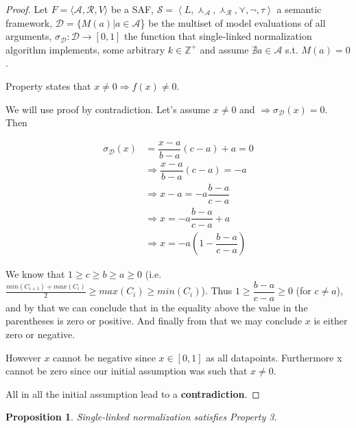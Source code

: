 \documentclass{article}
\newtheorem{proposition}{Proposition}
\newcommand{\real}{\mathbb{R}}  %
\newcommand{\args}{\mathcal{A}} %
\newcommand{\att}{\mathcal{R}}  %
\newcommand{\valueset}{L}
\newcommand{\safid}{F}               %
\newcommand{\saf}{\safid = \safbody} %
\newcommand{\safbody}{\langle \args, \att, V \rangle} %
\newcommand{\sembodyNew}{\left\langle \valueset,\SAFand_\mathcal{A}, \SAFand_\mathcal{R},\SAFor,\lnot,\tau \right\rangle} %
\newcommand{\SAFand}{\curlywedge}     %
\newcommand{\SAFor}{\curlyvee}        %
\newcommand{\sem}{\mathcal{S}}
\newcommand{\dataset}{\mathcal{D}}   %
\begin{document}
\begin{proof}
Let $\saf$ be a SAF, $\sem = \sembodyNew$ a semantic framework, $\dataset = \{M(a)|a \in \args$\} be the multiset of model evaluations of all arguments, $\sigma_{\dataset}: \dataset  \rightarrow  [0,1]$ the function that single-linked normalization algorithm implements, some arbitrary $k \in \mathbb{Z}^{+}$ and assume $\nexists a \in \args$ s.t. $M(a) = 0$. %

Property states that $x \neq 0 \Rightarrow f(x) \neq 0$. 

We will use proof by contradiction. Let's assume  $x \neq 0$ and $\Rightarrow \sigma_{\dataset}(x) = 0$. Then

\begin{align*}
  \sigma_{\dataset}(x) 
  &= \dfrac{x-a}{b-a} (c-a) + a = 0
  \\ &\Rightarrow  \dfrac{x-a}{b-a} (c-a) = -a    
  \\ &\Rightarrow  x - a= -a \dfrac{b-a}{c-a}  
  \\ &\Rightarrow  x = -a \dfrac{b-a}{c-a} + a
   \\ &\Rightarrow  x = -a   (1 -\dfrac{b-a}{c-a})                                              
\end{align*}

We know that $1 \geq c \geq b \geq a \geq 0$ (i.e. $\frac{min(C_{i+1})+max(C_i)}{2} \geq max(C_i) \geq min(C_i)$). Thus $1 \geq \dfrac{b-a}{c-a} \geq 0$  (for $c \neq a$), and by that we can conclude that in the equality above the value in the parentheses is zero or positive. And finally from that we may conclude $x$ is either zero or negative.

However $x$ cannot be negative since $x \in [0, 1]$ as all datapoints. Furthermore x cannot be zero since our initial assumption was such that  $x \neq 0$.

All in all the initial assumption lead to a \textbf{contradiction}.

\end{proof}

\begin{proposition}
Single-linked normalization satisfies Property 3.
\end{proposition}
\end{document}
